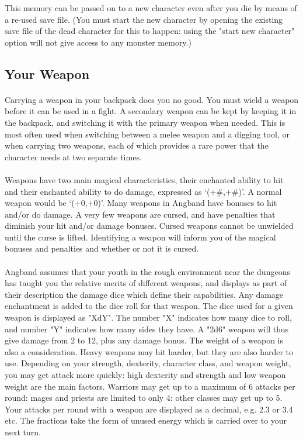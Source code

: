 This memory can be passed on to a new character even after you die by means
of a re-used save file. (You must start the new character by opening the
existing save file of the dead character for this to happen: using the
"start new character" option will not give access to any monster memory.)

\subsection{Your Weapon}
\paragraph{}Carrying a weapon in your backpack does you no good. You
must wield a weapon before it can be used in a fight. A secondary weapon
can be kept by keeping it in the backpack, and switching it with the
primary weapon when needed. This is most often used when switching
between a melee weapon and a digging tool, or when carrying two weapons,
each of which provides a rare power that the character needs at two
separate times.

\paragraph{}Weapons have two main magical characteristics, their enchanted ability
to hit and their enchanted ability to do damage, expressed as `(+\#,+\#)'.
A normal weapon would be `(+0,+0)'. Many weapons in Angband have
bonuses to hit and/or do damage. A very few weapons are cursed, and
have penalties that diminish your hit and/or damage bonuses. Cursed
weapons cannot be unwielded until the curse is lifted. Identifying a
weapon will inform you of the magical bonuses and penalties and whether
or not it is cursed.
  
\paragraph{}Angband assumes that your youth in the rough environment near the
dungeons has taught you the relative merits of different weapons, and
displays as part of their description the damage dice which define their
capabilities. Any damage enchantment is added to the dice roll for that
weapon. The dice used for a given weapon is displayed as "XdY". The
number "X" indicates how many dice to roll, and number "Y" indicates how
many sides they have. A "2d6" weapon will thus give damage from 2 to 12,
plus any damage bonus. The weight of a weapon is also a consideration.
Heavy weapons may hit harder, but they are also harder to use.
Depending on your strength, dexterity, character class, and weapon
weight, you may get attack more quickly: high dexterity and strength and
low weapon weight are the main factors. Warriors may get up to a maximum
of 6 attacks per round: mages and priests are limited to only 4: other
classes may get up to 5. Your attacks per round with a weapon are
displayed as a decimal, e.g. 2.3 or 3.4 etc. The fractions take the form
of unused energy which is carried over to your next turn.

